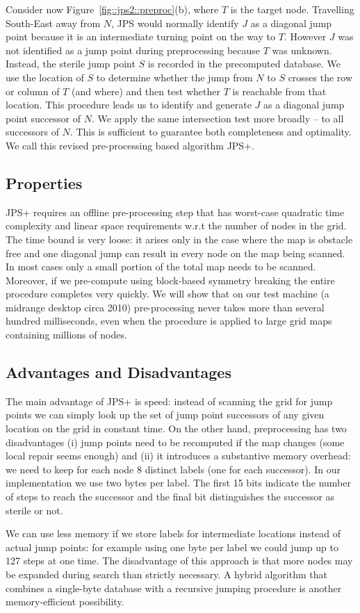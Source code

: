 Consider now Figure~\ref{fig::jps2::preproc}(b), where $T$ is the target node.  
Travelling South-East away from $N$, JPS would normally identify 
$J$ as a diagonal jump point because it is an intermediate turning
point on the way to $T$.
However $J$ was not identified as a jump point during preprocessing 
because $T$ was unknown.  
Instead, the sterile jump point $S$ is recorded in the precomputed 
database. We use the location of $S$ to determine whether the jump from 
$N$ to $S$ crosses the row or column of $T$ (and where) and then test 
whether $T$ is reachable from that location. This procedure 
leads us to identify and generate $J$ as a diagonal jump point successor
of $N$. We apply the same intersection test more broadly -- to all 
successors of $N$. This is sufficient to guarantee both completeness 
and optimality. We call this revised pre-processing based algorithm 
JPS+.
\subsection{Properties}
JPS+ requires an offline pre-processing step that has worst-case quadratic 
time complexity and linear space requirements w.r.t the number of nodes in 
the grid. The time bound is very loose: it arises only in the case 
where the map is obstacle free and one diagonal jump can result in
every node on the map being scanned. In most cases only a small portion
of the total map needs to be scanned. Moreover, if we pre-compute using block-based 
symmetry breaking the entire procedure completes very quickly.
We will show that on our test machine (a midrange desktop
circa 2010) pre-processing never takes more than several hundred milliseconds,
even when the procedure is applied to large grid maps containing millions
of nodes.
\subsection{Advantages and Disadvantages}
The main advantage of JPS+ is speed: instead of scanning the grid for jump
points we can simply look up the set of jump point successors of any given
location on the grid in constant time.  On the other hand, preprocessing has
two disadvantages (i) jump points need to be recomputed if the map changes
(some local repair seems enough) and (ii) it introduces a substantive memory
overhead: we need to keep for each node 8 distinct labels (one for each
successor).  In our implementation we use two bytes per label. The first 15
bits indicate the number of steps to reach the successor and the final bit
distinguishes the successor as sterile or not.
\par
We can use less memory if we store labels for intermediate locations instead
of actual jump points: for example using one byte per label we could jump up
to 127 steps at one time. The disadvantage of this approach is that more nodes
may be expanded during search than strictly necessary. A hybrid algorithm that
combines a single-byte database with a recursive jumping procedure is another
memory-efficient possibility.


